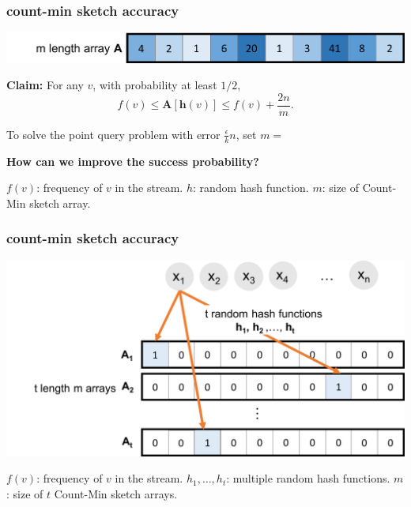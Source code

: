 \documentclass[]{beamer}
\newcommand{\bv}[1]{\mathbf{#1}}
\begin{document}
	
	\begin{frame}
		\frametitle{count-min sketch accuracy}
		\begin{center}
			\includegraphics[width=\textwidth]{cm5.png}
		\end{center}
		\textbf{Claim:} For any $v$, with probability at least $1/2$, 
		$$f(v) \le 	\bv{A}[\bv{h}(v)] \le f(v) + \frac{2n}{m}.$$
		
		To solve the point query problem with error $\frac{\epsilon}{k}n$, 
		set $m = \hspace{2em}$
		
		\vspace{3em}
		\alert{\textbf{How can we improve the success probability?}}

		\vspace{1em}
		\begin{block}{\vspace*{-3ex}}
			\small $f(v)$: frequency of $v$ in the stream. ${h}$: random hash function. $m$: size of Count-Min sketch array.
		\end{block}
	\end{frame}
	
	\begin{frame}
		\frametitle{count-min sketch accuracy}
		\begin{center}
			\hspace{-2em}
			\includegraphics[width=.85\textwidth]{cmm1.png}
		\end{center}
		
		\vspace{4em}
		\begin{block}{\vspace*{-3ex}}
			\small $f(v)$: frequency of $v$ in the stream. $h_1, \ldots, h_t$: multiple random hash functions. $m$: size of $t$ Count-Min sketch arrays.
		\end{block}
	\end{frame}
	
\end{document}
